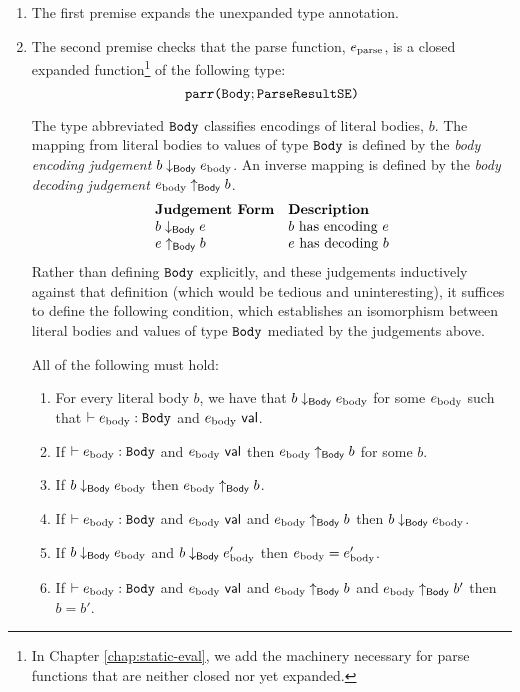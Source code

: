 \begin{enumerate}
\item The first premise expands the unexpanded type annotation.

\item The second premise checks that the parse function, $e_\text{parse}$, is a closed expanded function\footnote{In Chapter \ref{chap:static-eval}, we add the machinery necessary for parse functions that are neither closed nor yet expanded.} of the following type: \[\texttt{parr}\texttt{(}\mathtt{Body}; \mathtt{ParseResultSE}\texttt{)}\] 


The type abbreviated $\mathtt{Body}$ classifies encodings of literal bodies, $b$. The mapping from literal bodies to values of type $\mathtt{Body}$ is defined by the \emph{body encoding judgement} $b \downarrow_\mathsf{Body} e_\text{body}$. An inverse mapping is defined   by the \emph{body decoding judgement} $e_\text{body} \uparrow_\mathsf{Body} b$.
\[\begin{array}{ll}
\textbf{Judgement Form} & \textbf{Description}\\
b \downarrow_\mathsf{Body} e & \text{$b$ has encoding $e$}\\
e \uparrow_\mathsf{Body} b & \text{$e$ has decoding $b$}
\end{array}\]
Rather than defining $\mathtt{Body}$ explicitly, and these judgements inductively against that definition (which would be tedious and uninteresting), it suffices to define the following condition, which establishes an isomorphism between literal bodies and values of type $\mathtt{Body}$ mediated by the judgements above.

\begingroup
\def\thetheorem{\ref{condition:body-isomorphism}}
\begin{condition} All of the following must hold:
\begin{enumerate}
\item For every literal body $b$, we have that $b \downarrow_\mathsf{Body} e_\text{body}$ for some $e_\text{body}$ such that $\vdash e_\text{body} : \mathtt{Body}$ and $e_\text{body}~\mathsf{val}$.
\item If $\vdash e_\text{body} : \mathtt{Body}$ and $e_\text{body}~\mathsf{val}$ then $e_\text{body} \uparrow_\mathsf{Body} b$ for some $b$.
\item If $b \downarrow_\mathsf{Body} e_\text{body}$ then $e_\text{body} \uparrow_\mathsf{Body} b$.
\item If $\vdash e_\text{body} : \mathtt{Body}$ and $e_\text{body}~\mathsf{val}$ and $e_\text{body} \uparrow_\mathsf{Body} b$ then $b \downarrow_\mathsf{Body} e_\text{body}$. 
\item If $b \downarrow_\mathsf{Body} e_\text{body}$ and $b \downarrow_\mathsf{Body} e_\text{body}'$ then $e_\text{body} = e_\text{body}'$.
\item If $\vdash e_\text{body} : \mathtt{Body}$ and $e_\text{body}~\mathsf{val}$ and $e_\text{body} \uparrow_\mathsf{Body} b$ and $e_\text{body} \uparrow_\mathsf{Body} b'$ then $b=b'$.
\end{enumerate}
\end{condition}
\endgroup


\end{enumerate}
